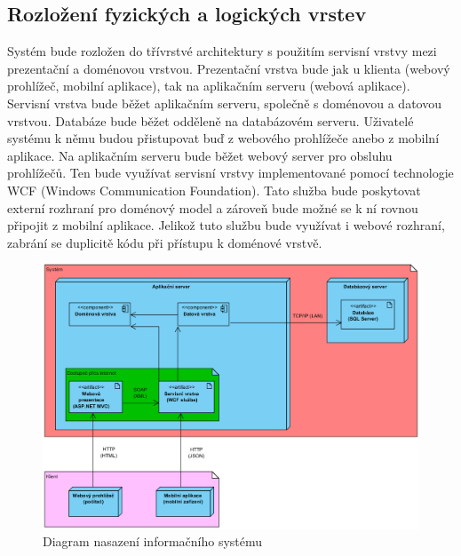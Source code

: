 \documentclass[a4paper,10pt,titlepage]{article}
\begin{document}
			\subsection{Rozložení fyzických a logických vrstev}
				Systém bude rozložen do třívrstvé architektury s použitím servisní vrstvy mezi prezentační a doménovou vrstvou.
				Prezentační vrstva bude jak u klienta (webový prohlížeč, mobilní aplikace), tak na aplikačním serveru (webová aplikace).
				Servisní vrstva bude běžet aplikačním serveru, společně s doménovou a datovou vrstvou.
				Databáze bude běžet odděleně na databázovém serveru.
				Uživatelé systému k němu budou přistupovat buď z webového prohlížeče anebo z mobilní aplikace.
				Na aplikačním serveru bude běžet webový server pro obsluhu prohlížečů. Ten bude využívat servisní vrstvy
				implementované pomocí technologie WCF (Windows Communication Foundation). Tato služba bude poskytovat externí rozhraní
				pro doménový model a zároveň bude možné se k ní rovnou připojit z mobilní aplikace. Jelikož tuto službu bude využívat i webové rozhraní, zabrání
				se duplicitě kódu při přístupu k doménové vrstvě.
				\begin{figure}[H]
					\centering
							\includegraphics[width=\textwidth]{vis_deployment_diagram}
					\caption{Diagram nasazení informačního systému}
				\end{figure}	
			
\end{document}
